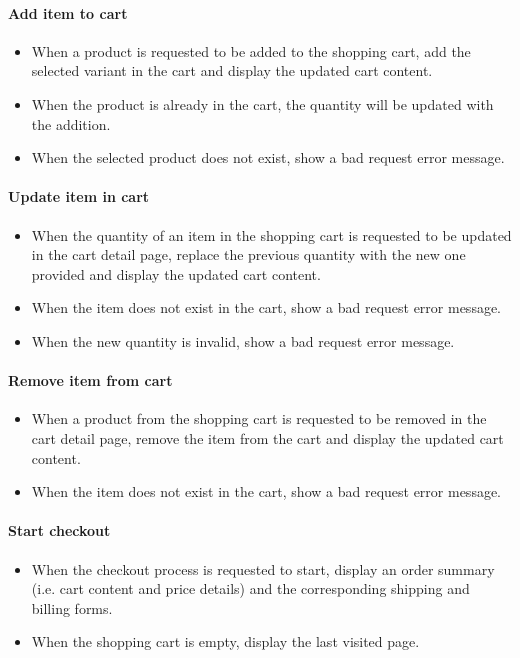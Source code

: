 \begin{appendices}
\paragraph{Add item to cart}
\begin{itemize}
	\item When a product is requested to be added to the shopping cart, add the selected variant in the cart and display the updated cart content.
	\item When the product is already in the cart, the quantity will be updated with the addition.
	\item When the selected product does not exist, show a bad request error message.
\end{itemize}

\paragraph{Update item in cart}
\begin{itemize}
	\item When the quantity of an item in the shopping cart is requested to be updated in the cart detail page, replace the previous quantity with the new one provided and display the updated cart content.
	\item When the item does not exist in the cart, show a bad request error message.
	\item When the new quantity is invalid, show a bad request error message.
\end{itemize}

\paragraph{Remove item from cart}
\begin{itemize}
	\item When a product from the shopping cart is requested to be removed in the cart detail page, remove the item from the cart and display the updated cart content.
	\item When the item does not exist in the cart, show a bad request error message.
\end{itemize}

\paragraph{Start checkout}
\begin{itemize}
	\item When the checkout process is requested to start, display an order summary (i.e. cart content and price details) and the corresponding shipping and billing forms.
	\item When the shopping cart is empty, display the last visited page.
\end{itemize}


\end{appendices}
